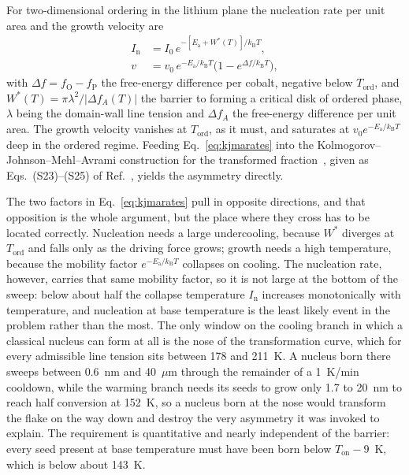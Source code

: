 \documentclass[reprint,twocolumn,prb,amsmath,amssymb,superscriptaddress,floatfix]{revtex4-2}
\newcommand{\kB}{k_{\mathrm{B}}}
\newcommand{\Ea}{E_{\mathrm{a}}}
\newcommand{\Ton}{T_{\mathrm{on}}}
\newcommand{\Tcol}{T_{\mathrm{ord}}}
\begin{document}
For two-dimensional ordering in the lithium plane the nucleation rate per unit area and the
growth velocity are
\begin{equation}
\begin{aligned}
  I_{\mathrm{n}} &= I_{0}\,e^{-[\Ea+W^{*}(T)]/\kB T},\\
  v &= v_{0}\,e^{-\Ea/\kB T}\bigl(1-e^{\Delta f/\kB T}\bigr),
\end{aligned}
  \label{eq:kjmarates}
\end{equation}
with $\Delta f=f_{\mathrm{O}}-f_{\mathrm{P}}$ the free-energy difference per cobalt, negative
below $\Tcol$, and $W^{*}(T)=\pi\lambda^{2}/|\Delta f_{A}(T)|$ the barrier to forming a
critical disk of ordered phase, $\lambda$ being the domain-wall line tension and $\Delta f_{A}$
the free-energy difference per unit area. The growth velocity vanishes at $\Tcol$, as it must,
and saturates at $v_{0}e^{-\Ea/\kB T}$ deep in the ordered regime. Feeding
Eq.~\eqref{eq:kjmarates} into the Kolmogorov--Johnson--Mehl--Avrami construction for the
transformed fraction~\cite{Kolmogorov1937,Johnson1939,Avrami1939,Avrami1940}, given as Eqs.~(S23)--(S25)
of Ref.~\cite{SM}, yields the asymmetry directly.

The two factors in Eq.~\eqref{eq:kjmarates} pull in opposite directions, and that opposition is
the whole argument, but the place where they cross has to be located correctly. Nucleation needs
a large undercooling, because $W^{*}$ diverges at $\Tcol$ and falls only as the driving force
grows; growth needs a high temperature, because the mobility factor $e^{-\Ea/\kB T}$ collapses
on cooling. The nucleation rate, however, carries that same mobility factor, so it is not large
at the bottom of the sweep: below about half the collapse temperature $I_{\mathrm{n}}$ increases
monotonically with temperature, and nucleation at base temperature is the least likely event in
the problem rather than the most. The only window on the cooling branch in which a classical
nucleus can form at all is the nose of the transformation curve, which for every admissible line
tension sits between 178 and 211~K. A nucleus born there sweeps between 0.6~nm and 40~$\mu$m
through the remainder of a 1~K/min cooldown, while the warming branch needs its seeds to grow
only 1.7 to 20~nm to reach half conversion at 152~K, so a nucleus born at the nose would
transform the flake on the way down and destroy the very asymmetry it was invoked to explain.
The requirement is quantitative and nearly independent of the barrier: every seed present at
base temperature must have been born below $\Ton-9$~K, which is below about 143~K.
\end{document}
